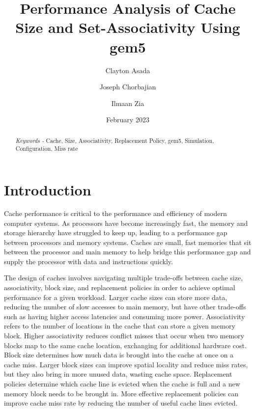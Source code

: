 \documentclass[conference]{IEEEtran}
\begin{document}
\title{Performance Analysis of Cache Size and Set-Associativity Using gem5}

\author[1]{Clayton Asada}
\author[2]{Joseph Chorbajian}
\author[3]{Ilmaan Zia}


\date{February 2023}



\maketitle



\begin{abstract}

\emph{Keywords - } Cache, Size, Associativity, Replacement Policy, gem5, Simulation, Configuration, Miss rate
\end{abstract}


\section{Introduction}

Cache performance is critical to the performance and efficiency of modern computer systems. As processors have become increasingly fast, the memory and storage hierarchy have struggled to keep up, leading to a performance gap between processors and memory systems. Caches are small, fast memories that sit between the processor and main memory to help bridge this performance gap and supply the processor with data and instructions quickly\cite{hennessy_computer_2012}.

The design of caches involves navigating multiple trade-offs between cache size, associativity, block size, and replacement policies in order to achieve optimal performance for a given workload. Larger cache sizes can store more data, reducing the number of slow accesses to main memory, but have other trade-offs such as having higher access latencies and consuming more power. Associativity refers to the number of locations in the cache that can store a given memory block. Higher associativity reduces conflict misses that occur when two memory blocks map to the same cache location, exchanging for additional hardware cost. Block size determines how much data is brought into the cache at once on a cache miss. Larger block sizes can improve spatial locality and reduce miss rates, but they also bring in more unused data, wasting cache space. Replacement policies determine which cache line is evicted when the cache is full and a new memory block needs to be brought in. More effective replacement policies can improve cache miss rate by reducing the number of useful cache lines evicted\cite{hennessy_computer_2012}.
\end{document}
